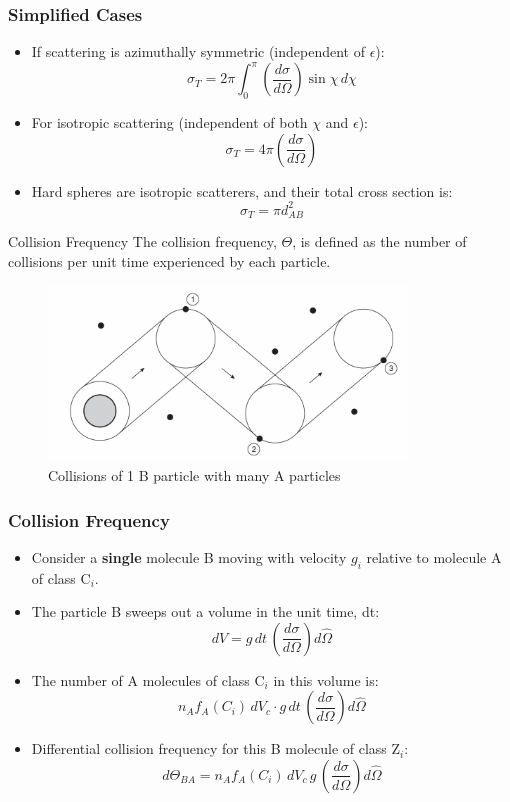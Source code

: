 \documentclass{beamer}
\begin{document}
\begin{frame}
\frametitle{Simplified Cases}
\begin{itemize}
    \item If scattering is azimuthally symmetric (independent of \( \epsilon \)):
    \[
    \sigma_T = 2\pi \int_0^{\pi} \left( \frac{d\sigma}{d\Omega} \right) \sin \chi \, d\chi
    \]
    \item For isotropic scattering (independent of both \( \chi \) and \( \epsilon \)):
    \[
    \sigma_T = 4\pi \left( \frac{d\sigma}{d\Omega} \right)
    \]
    \item Hard spheres are isotropic scatterers, and their total cross section is:
    \[
    \sigma_T = \pi d_{AB}^2
    \]
\end{itemize}
\end{frame}

\begin{frame}{Collision Frequency}
The collision frequency, $\Theta$, is defined as the number of collisions per unit time experienced by each particle.
\begin{figure}
        \centering
        \includegraphics[width=0.85\textwidth]{collision_freq.png}
        \caption{Collisions of 1 B particle with many A particles}
    \end{figure}    
\end{frame}



\begin{frame}
\frametitle{Collision Frequency}
\begin{itemize}
    \item Consider a {\bf single} molecule B moving with velocity \( g_i \) relative to molecule A of class C$_i$. 
    \item The particle B sweeps out a volume in the unit time, dt:
    \[
    dV = g \, dt \, \left( \frac{d\sigma}{d\Omega} \right) d\hat{\Omega}
    \]
    \item The number of A molecules of class C$_i$ in this volume is:
    \[
    n_A f_A(C_i) \, dV_c \cdot g \, dt \, \left( \frac{d\sigma}{d\Omega} \right) d\hat{\Omega}
    \]
    \item Differential collision frequency for this B molecule of class Z$_i$:
    \[
    d\Theta_{BA} = n_A f_A(C_i) \, dV_c \, g \,  \left( \frac{d\sigma}{d\Omega} \right) d\hat{\Omega}
    \]
\end{itemize}
\end{frame}
\end{document}
